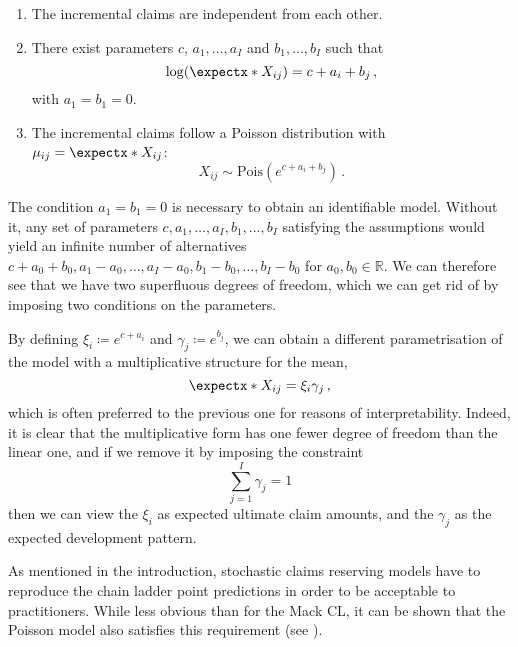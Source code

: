 \documentclass[a4paper]{book}
\begin{document}
\begin{model} \leavevmode \label{model:poisson}
  \begin{enumerate}
      \item \label{assump:poisson1}
      The incremental claims are independent from each other.
      \item \label{assump:poisson2}
      There exist parameters $c$, $a_1, \dots, a_I$ and $b_1, \dots, b_I$ such that
      \begin{equation} \label{eq:linear-predictor-poisson}
          \log(\expect{X_{ij}}) = c + a_i + b_j \,,
      \end{equation}
      with $a_1 = b_1 = 0$.
      \item \label{assump:poisson3}
      The incremental claims follow a Poisson distribution with $\mu_{ij} = \expect{X_{ij}}$:
      \begin{equation}
          X_{ij} \sim \mathrm{Pois}(e^{c + a_i + b_j}) \,.
      \end{equation}
  \end{enumerate}
\end{model}

The condition $a_1 = b_1 = 0$ is necessary to obtain an identifiable model. Without it, any set of parameters $c, a_1, \dots, a_I, b_1, \dots, b_I$ satisfying the assumptions would yield an infinite number of alternatives $c + a_0 + b_0, a_1 - a_0, \dots, a_I - a_0, b_1 - b_0, \dots, b_I - b_0$ for $a_0, b_0 \in \mathbb{R}$. We can therefore see that we have two superfluous degrees of freedom, which we can get rid of by imposing two conditions on the parameters. 

By defining $\xi_i \coloneqq e^{c + a_i}$ and $\gamma_j \coloneqq e^{b_j}$, we can obtain a different parametrisation of the model with a multiplicative structure for the mean,
\begin{equation}
  \expect{X_{ij}} = \xi_i \gamma_j \,,
\end{equation}
which is often preferred to the previous one for reasons of interpretability. Indeed, it is clear that the multiplicative form has one fewer degree of freedom than the linear one, and if we remove it by imposing the constraint
\begin{equation}
  \sum_{j = 1}^I \gamma_j = 1
\end{equation}
then we can view the $\xi_i$ as expected ultimate claim amounts, and the $\gamma_j$ as the expected development pattern.

As mentioned in the introduction, stochastic claims reserving models have to reproduce the chain ladder point predictions in order to be acceptable to practitioners. While less obvious than for the Mack CL, it can be shown that the Poisson model also satisfies this requirement (see \cite[Lemma 2.16]{wuthrich:stochastic-reserving}).
\end{document}
